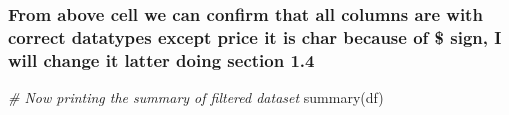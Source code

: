 \documentclass[
]{article}
\newenvironment{Shaded}{\begin{snugshade}}{\end{snugshade}}
\newcommand{\CommentTok}[1]{\textcolor[rgb]{0.56,0.35,0.01}{\textit{#1}}}
\newcommand{\FunctionTok}[1]{\textcolor[rgb]{0.00,0.00,0.00}{#1}}
\newcommand{\NormalTok}[1]{#1}
\begin{document}
\hypertarget{from-above-cell-we-can-confirm-that-all-columns-are-with-correct-datatypes-except-price-it-is-char-because-of-sign-i-will-change-it-latter-doing-section-1.4}{%
\subsubsection{From above cell we can confirm that all columns are with
correct datatypes except price it is char because of \$ sign, I will
change it latter doing section
1.4}\label{from-above-cell-we-can-confirm-that-all-columns-are-with-correct-datatypes-except-price-it-is-char-because-of-sign-i-will-change-it-latter-doing-section-1.4}}

\begin{Shaded}
\begin{Highlighting}[]
\CommentTok{\# Now printing the summary of filtered dataset}
\FunctionTok{summary}\NormalTok{(df)}
\end{Highlighting}
\end{Shaded}
\end{document}

